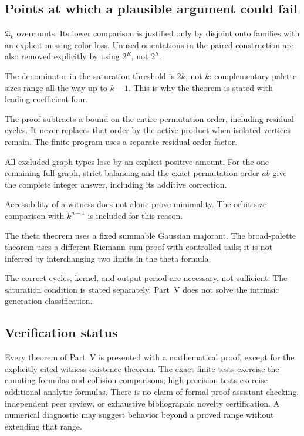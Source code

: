 \documentclass[11pt,a4paper]{article}
\numberwithin{equation}{section}
\theoremstyle{definition}
\theoremstyle{remark}
\newcommand{\nlenv}{\mathfrak A}
\begin{document}
\subsection{Points at which a plausible argument could fail}
\begin{description}[style=nextline]
\item[Allowed palettes versus used palettes.]
$\nlenv_k$ overcounts. Its lower comparison is justified only by disjoint
onto families with an explicit missing-color loss. Unused orientations
in the paired construction are also removed explicitly by using $2^R$,
not $2^h$.
\item[The worst palette can be large.]
The denominator in the saturation threshold is $2k$, not $k$:
complementary palette sizes range all the way up to $k-1$.
This is why the theorem is stated with leading coefficient four.
\item[Disconnected graph order.]
The proof subtracts a bound on the entire permutation order, including
residual cycles. It never replaces that order by the active product
when isolated vertices remain. The finite program uses a separate
residual-order factor.
\item[Exactness versus asymptotic optimality.]
All excluded graph types lose by an explicit positive amount.
For the one remaining full graph, strict balancing and the exact
permutation order $ab$ give the complete integer answer, including its
additive correction.
\item[Minimality of the original automaton.]
Accessibility of a witness does not alone prove minimality.
The orbit-size comparison with $k^{n-1}$ is included for this reason.
\item[Uniform limit interchanges.]
The theta theorem uses a fixed summable Gaussian majorant.
The broad-palette theorem uses a different Riemann-sum proof with
controlled tails; it is not inferred by interchanging two limits in the
theta formula.
\item[Scope of rigidity.]
The correct cycles, kernel, and output period are necessary, not sufficient.
The saturation condition is stated separately. Part~V does not
solve the intrinsic generation classification.
\end{description}

\subsection{Verification status}
Every theorem of Part~V is presented with a mathematical proof, except
for the explicitly cited witness existence theorem. The exact finite tests
exercise the counting formulas and collision comparisons; high-precision
tests exercise additional analytic formulas. There is no claim of formal
proof-assistant checking, independent peer review, or exhaustive
bibliographic novelty certification. A numerical diagnostic may suggest
behavior beyond a proved range without extending that range.
\end{document}
